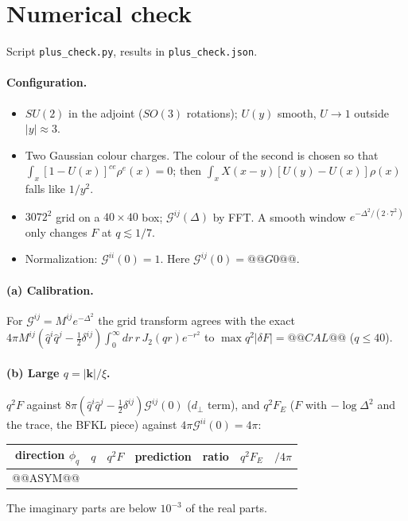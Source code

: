 \documentclass[10pt]{article}
\numberwithin{equation}{section}
\newcommand{\GG}{\mathcal G}
\begin{document}
\section{Numerical check}\label{sec:num}
Script \texttt{plus\_check.py}, results in \texttt{plus\_check.json}.
\paragraph{Configuration.}
\begin{itemize}
\item $SU(2)$ in the adjoint ($SO(3)$ rotations); $U(y)$ smooth, $U\to1$ outside $|y|\approx3$.
\item Two Gaussian colour charges. The colour of the second is chosen so that $\int_x[1-U(x)]^{ce}\rho^e(x)=0$; then $\int_xX(x-y)[U(y)-U(x)]\rho(x)$ falls like $1/y^2$.
\item $3072^2$ grid on a $40\times40$ box; $\GG^{ij}(\Delta)$ by FFT. A smooth window $e^{-\Delta^2/(2\cdot7^2)}$ only changes $F$ at $q\lesssim1/7$.
\item Normalization: $\GG^{ii}(0)=1$. Here $\GG^{ij}(0)=@@G0@@$.
\end{itemize}
\paragraph{(a) Calibration.} For $\GG^{ij}=M^{ij}e^{-\Delta^2}$ the grid transform agrees with the exact $4\pi M^{ij}(\hat q^i\hat q^j-\frac12\delta^{ij})\int_0^\infty dr\,r\,J_2(qr)e^{-r^2}$ to $\max q^2|\delta F|=@@CAL@@$ ($q\le40$).
\paragraph{(b) Large $q=|\mathbf k|/\xi$.} $q^2F$ against $8\pi(\hat q^i\hat q^j-\frac12\delta^{ij})\GG^{ij}(0)$ ($d_\perp$ term), and $q^2F_E$ ($F$ with $-\log\Delta^2$ and the trace, the BFKL piece) against $4\pi\GG^{ii}(0)=4\pi$:
\begin{center}\small
\begin{tabular}{@{}rrrrr|rr@{}}\toprule
direction $\phi_q$ & $q$ & $q^2F$ & prediction & ratio & $q^2F_E$ & $/4\pi$\\\midrule
@@ASYM@@
\bottomrule
\end{tabular}
\end{center}
The imaginary parts are below $10^{-3}$ of the real parts.
\end{document}

